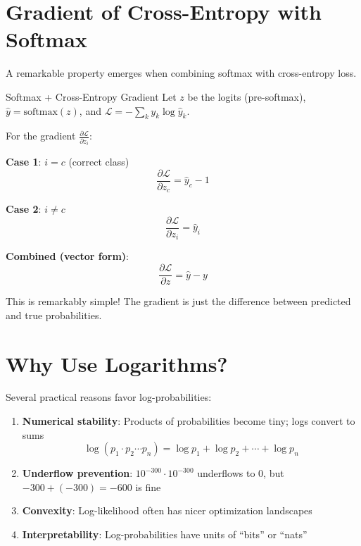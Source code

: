 \section{Gradient of Cross-Entropy with Softmax}

A remarkable property emerges when combining softmax with cross-entropy loss.

\begin{derivation}{Softmax + Cross-Entropy Gradient}
Let $z$ be the logits (pre-softmax), $\hat{y} = \text{softmax}(z)$, and $\mathcal{L} = -\sum_k y_k \log \hat{y}_k$.

For the gradient $\frac{\partial \mathcal{L}}{\partial z_i}$:

\textbf{Case 1}: $i = c$ (correct class)
\[
\frac{\partial \mathcal{L}}{\partial z_c} = \hat{y}_c - 1
\]

\textbf{Case 2}: $i \neq c$
\[
\frac{\partial \mathcal{L}}{\partial z_i} = \hat{y}_i
\]

\textbf{Combined (vector form)}:
\[
\boxed{\frac{\partial \mathcal{L}}{\partial z} = \hat{y} - y}
\]
\end{derivation}

This is remarkably simple! The gradient is just the difference between predicted and true probabilities.

\section{Why Use Logarithms?}

Several practical reasons favor log-probabilities:

\begin{enumerate}
    \item \textbf{Numerical stability}: Products of probabilities become tiny; logs convert to sums
    \[
    \log(p_1 \cdot p_2 \cdots p_n) = \log p_1 + \log p_2 + \cdots + \log p_n
    \]
    
    \item \textbf{Underflow prevention}: $10^{-300} \cdot 10^{-300}$ underflows to 0, but $-300 + (-300) = -600$ is fine
    
    \item \textbf{Convexity}: Log-likelihood often has nicer optimization landscapes
    
    \item \textbf{Interpretability}: Log-probabilities have units of ``bits'' or ``nats''
\end{enumerate}

